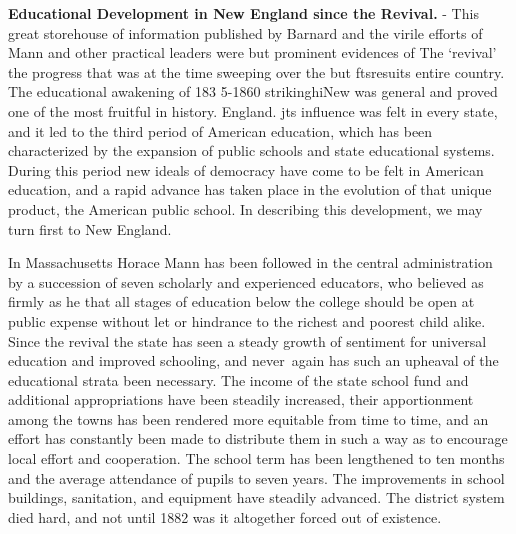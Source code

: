 \documentclass[
]{book}
\begin{document}
\textbf{Educational Development in New England since the Revival.} - This great storehouse of information published by Barnard and the virile efforts of Mann and other practical leaders were but prominent evidences of The `revival' the progress that was at the time sweeping over the but ftsresuits entire country. The educational awakening of 183 5-1860 strikinghiNew was general and proved one of the most fruitful in history. England. jts influence was felt in every state, and it led to the third period of American education, which has been characterized by the expansion of public schools and state educational systems. During this period new ideals of democracy have come to be felt in American education, and a rapid advance has taken place in the evolution of that unique product, the American public school. In describing this development, we may turn first to New England.

In Massachusetts Horace Mann has been followed in the central administration by a succession of seven scholarly and experienced educators, who believed as firmly as he that all stages of education below the college should be open at public expense without let or hindrance to the richest and poorest child alike. Since the revival the state has seen a steady growth of sentiment for universal education and improved schooling, and never~again has such an upheaval of the educational strata been necessary. The income of the state school fund and additional appropriations have been steadily increased, their apportionment among the towns has been rendered more equitable from time to time, and an effort has constantly been made to distribute them in such a way as to encourage local effort and cooperation. The school term has been lengthened to ten months and the average attendance of pupils to seven years. The improvements in school buildings, sanitation, and equipment have steadily advanced. The district system died hard, and not until 1882 was it altogether forced out of existence.
\end{document}
